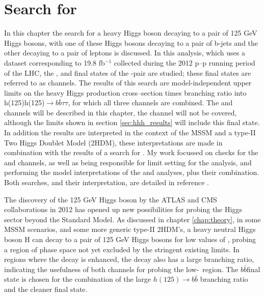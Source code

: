 \chapter{\texorpdfstring{Search for \Htohhtobbtautau}{Search for H -> hh -> bbtautau}}
\label{chap:hhh}
In this chapter the search for a heavy Higgs boson decaying to a pair of 125 GeV Higgs bosons, with one of these Higgs bosons decaying to 
a pair of b-jets and the other decaying to a pair of \Ptau leptons is discussed. In this analysis, which 
uses a dataset corresponding to 19.8 fb$^{-1}$ collected during the 2012 p--p running
period of the \ac{LHC}, the \etau, \mutau and \tautau final states
of the \Pgt-pair are studied; these final states are referred to as channels. 
The results of this search are model-independent
upper limits on the heavy Higgs production cross--section times branching ratio into h(125)h(125)$\rightarrow b\bar{b} \tau\tau$, for
which all three channels are combined. The \etau and \mutau channels will be described in this chapter, the \tautau channel will not
be covered, although the limits shown in section \ref{sec:hhh_results} will include this final state.
In addition  the results are interpreted in the context of the MSSM and a type-II Two Higgs Doublet Model (2HDM), 
these interpretations are made in combination with the results of a search for \AtoZhtolltautau \cite{CMS-HIG-14-034}. 
My work focussed on checks for the \mutau and \etau channels, as well as being
responsible for limit setting for the \Htohh analysis, and performing the model interpretations
of the \Htohh and \AtoZh analyses, plus their combination.
Both searches, and their interpretation, are detailed in reference \cite{CMS-HIG-14-034}.

The discovery of the 125 GeV Higgs boson by the ATLAS and CMS collaborations in 2012 \cite{HDiscoveryAtlas,HDiscoveryCMS} has opened up
new possibilities for probing the Higgs sector beyond the Standard Model. As discussed in chapter \ref{chap:theory}, in some \ac{MSSM} scenarios, and some more
generic type-II 2HDM's, a heavy neutral Higgs boson H can decay to a pair of 125 GeV Higgs bosons for low values
of \tanb, probing a region of phase space not yet excluded by the stringent existing limits. In regions where
the decay \Htohh is enhanced, the \AtoZh decay also has a large branching ratio, indicating the usefulness
of both channels for probing the low-\tanb~region. The $b\bar{b}$\tautau final state is chosen for the combination
of the large $h(125) \rightarrow b\bar{b}$ branching ratio and the cleaner \htotautau final state.

